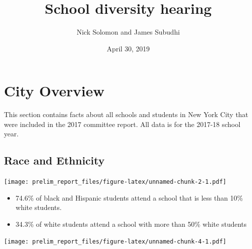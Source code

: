 \documentclass[11pt,]{article}
\title{School diversity hearing}
\author{Nick Solomon and James Subudhi}
\date{April 30, 2019}
\providecommand{\tightlist}{%
  \setlength{\itemsep}{0pt}\setlength{\parskip}{0pt}}
\begin{document}
\maketitle
\thispagestyle{fancy}

\hypertarget{city-overview}{%
\section{City Overview}\label{city-overview}}

This section contains facts about all schools and students in New York City that were included in the 2017 committee report. All data is for the 2017-18 school year.

\hypertarget{race-and-ethnicity}{%
\subsection{Race and Ethnicity}\label{race-and-ethnicity}}

\texttt{[image: prelim\_report\_files/figure-latex/unnamed-chunk-2-1.pdf]}
\begin{itemize}
\tightlist
\item
  74.6\% of black and Hispanic students attend a school that is less than 10\% white students.
\item
  34.3\% of white students attend a school with more than 50\% white students
\end{itemize}
\texttt{[image: prelim\_report\_files/figure-latex/unnamed-chunk-4-1.pdf]}
\end{document}
